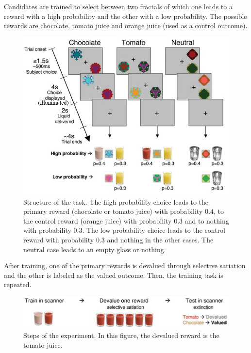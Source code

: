 \begin{casestudy}
    Candidates are trained to select between two fractals of which 
    one leads to a reward with a high probability and the other with a low probability.
    The possible rewards are chocolate, tomato juice and orange juice (used as a control outcome).

    \begin{figure}[H]
        \centering
        \includegraphics[width=0.55\linewidth]{./img/human_goal_directed_experiment.png}
        \caption{
            Structure of the task. The high probability choice leads to the primary reward (chocolate or tomato juice) with probability $0.4$, 
            to the control reward (orange juice) with probability $0.3$ and to nothing with probability $0.3$.
            The low probability choice leads to the control reward with probability $0.3$ and nothing in the other cases.
            The neutral case leads to an empty glass or nothing.
        }
    \end{figure}

    After training, one of the primary rewards is devalued through selective satiation and the other is labeled as the valued outcome.
    Then, the training task is repeated.
    \begin{figure}[H]
        \centering
        \includegraphics[width=0.55\linewidth]{./img/human_goal_directed_experiment2.png}
        \caption{
            Steps of the experiment. In this figure, the devalued reward is the tomato juice.        
        }
    \end{figure}


\end{casestudy}
